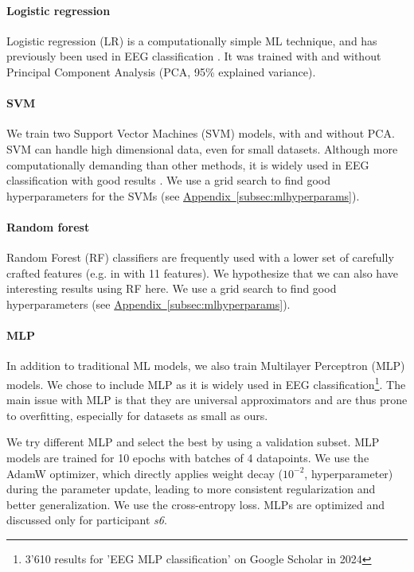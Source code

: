 \documentclass[10pt,conference,compsocconf]{IEEEtran}
\newcommand{\aref}[1]{\hyperref[#1]{Appendix~\ref*{#1}}}
\begin{document}
\paragraph{Logistic regression}
Logistic regression (LR) is a computationally simple ML technique, and has previously been used in EEG classification \cite{SUBASI200587, NIPS2006_35937e34}. It was trained with and without Principal Component Analysis (PCA, 95\% explained variance).

\paragraph{SVM}
We train two Support Vector Machines (SVM) models, with and without PCA. SVM can handle high dimensional data, even for small datasets. Although more computationally demanding than other methods, it is widely used in EEG classification with good results \cite{knn_svm_review}. We use a grid search to find good hyperparameters for the SVMs (see \aref{subsec:mlhyperparams}).

\paragraph{Random forest}
Random Forest (RF) classifiers are frequently used with a lower set of carefully crafted features (e.g. in \cite{eegrfclassif} with 11 features). We hypothesize that we can also have interesting results using RF here. We use a grid search to find good hyperparameters (see \aref{subsec:mlhyperparams}).

\paragraph{MLP}
In addition to traditional ML models, we also train Multilayer Perceptron (MLP) models. We chose to include MLP as it is widely used in EEG classification\footnote{3'610 results for 'EEG MLP classification' on Google Scholar in 2024}. The main issue with MLP is that they are universal approximators and are thus prone to overfitting, especially for datasets as small as ours.

We try different MLP and select the best by using a validation subset. MLP models are trained for 10 epochs with batches of 4 datapoints. We use the AdamW optimizer, which directly applies weight decay (\(10^{-2}\), hyperparameter) during the parameter update, leading to more consistent regularization and better generalization. We use the cross-entropy loss. MLPs are optimized and discussed only for participant \textit{s6}.
\end{document}
